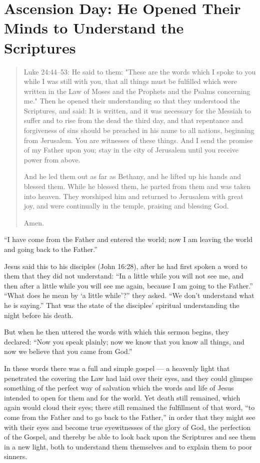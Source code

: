 
\section{Ascension Day: He Opened Their Minds to Understand the Scriptures}

\begin{quote}

Luke 24:44–53: He said to them: "These are the words which I spoke to you while I was still with you, that all things must be fulfilled which were written in the Law of Moses and the Prophets and the Psalms concerning me." Then he opened their understanding so that they understood the Scriptures, and said: It is written, and it was necessary for the Messiah to suffer and to rise from the dead the third day, and that repentance and forgiveness of sins should be preached in his name to all nations, beginning from Jerusalem. You are witnesses of these things. And I send the promise of my Father upon you; stay in the city of Jerusalem until you receive power from above.

And he led them out as far as Bethany, and he lifted up his hands and blessed them. While he blessed them, he parted from them and was taken into heaven. They worshiped him and returned to Jerusalem with great joy, and were continually in the temple, praising and blessing God. 

Amen.

\end{quote}

\bigskip


“I have come from the Father and entered the world; now I am leaving the world and going back to the Father.”

Jesus said this to his disciples (John 16:28), after he had first spoken a word to them that they did not understand: “In a little while you will not see me, and then after a little while you will see me again, because I am going to the Father.” “What does he mean by ‘a little while’?” they asked. “We don’t understand what he is saying.” That was the state of the disciples’ spiritual understanding the night before his death.

But when he then uttered the words with which this sermon begins, they declared: “Now you speak plainly; now we know that you know all things, and now we believe that you came from God.”

In these words there was a full and simple gospel — a heavenly light that penetrated the covering the Law had laid over their eyes, and they could glimpse something of the perfect way of salvation which the words and life of Jesus intended to open for them and for the world. Yet death still remained, which again would cloud their eyes; there still remained the fulfillment of that word, “to come from the Father and to go back to the Father,” in order that they might see with their eyes and become true eyewitnesses of the glory of God, the perfection of the Gospel, and thereby be able to look back upon the Scriptures and see them in a new light, both to understand them themselves and to explain them to poor sinners.

